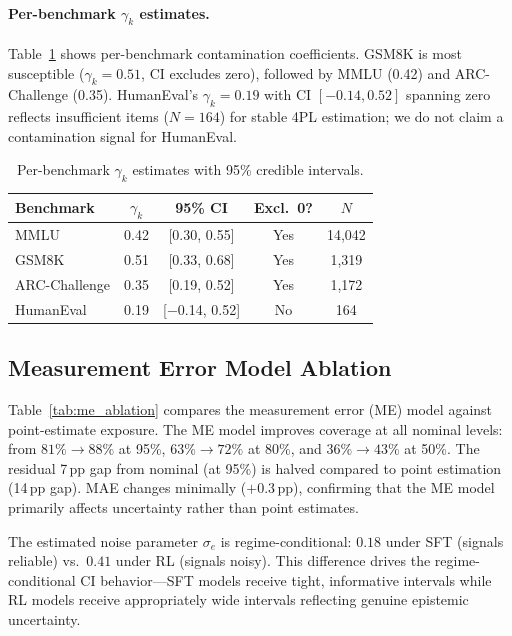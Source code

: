 \documentclass[letterpaper]{article}
\begin{document}
\paragraph{Per-benchmark $\gamma_k$ estimates.}
Table~\ref{tab:gamma_k} shows per-benchmark contamination coefficients.
GSM8K is most susceptible ($\gamma_k{=}0.51$, CI excludes zero), followed by MMLU (0.42) and ARC-Challenge (0.35).
HumanEval's $\gamma_k{=}0.19$ with CI $[-0.14, 0.52]$ spanning zero reflects insufficient items ($N{=}164$) for stable 4PL estimation; we do not claim a contamination signal for HumanEval.

\begin{table}[t]
\centering
\caption{Per-benchmark $\gamma_k$ estimates with 95\% credible intervals.}
\label{tab:gamma_k}
\begin{tabular}{lcccc}
\toprule
\textbf{Benchmark} & $\gamma_k$ & \textbf{95\% CI} & \textbf{Excl.\ 0?} & $N$ \\
\midrule
MMLU & 0.42 & [0.30, 0.55] & Yes & 14,042 \\
GSM8K & 0.51 & [0.33, 0.68] & Yes & 1,319 \\
ARC-Challenge & 0.35 & [0.19, 0.52] & Yes & 1,172 \\
HumanEval & 0.19 & [$-$0.14, 0.52] & No & 164 \\
\bottomrule
\end{tabular}
\end{table}

\subsection{Measurement Error Model Ablation}
\label{sec:noise_ablation}

Table~\ref{tab:me_ablation} compares the measurement error (ME) model against point-estimate exposure.
The ME model improves coverage at all nominal levels: from $81\%{\to}88\%$ at 95\%, $63\%{\to}72\%$ at 80\%, and $36\%{\to}43\%$ at 50\%.
The residual 7\,pp gap from nominal (at 95\%) is halved compared to point estimation (14\,pp gap).
MAE changes minimally ($+0.3$\,pp), confirming that the ME model primarily affects uncertainty rather than point estimates.

The estimated noise parameter $\sigma_e$ is regime-conditional: $0.18$ under SFT (signals reliable) vs.\ $0.41$ under RL (signals noisy).
This difference drives the regime-conditional CI behavior---SFT models receive tight, informative intervals while RL models receive appropriately wide intervals reflecting genuine epistemic uncertainty.
\end{document}
